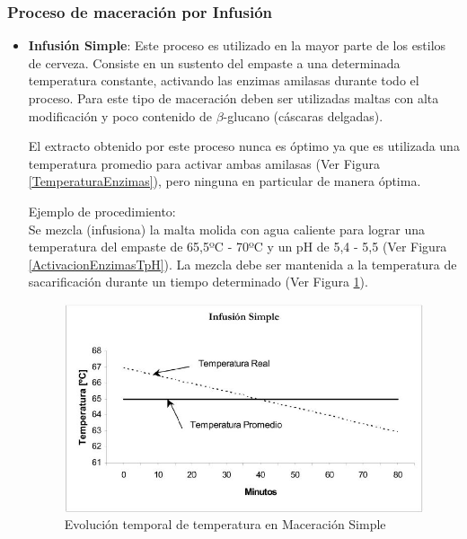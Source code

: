             \subsubsection{Proceso de maceración por Infusión}
                \begin{itemize}
                    \item \textbf{Infusión Simple}: Este proceso es utilizado en la mayor parte de los estilos de cerveza. Consiste en un sustento del empaste a una determinada temperatura constante, activando las enzimas amilasas durante todo el proceso. Para este tipo de maceración deben ser utilizadas maltas con alta modificación y poco contenido de $\beta$-glucano (cáscaras delgadas).
                    
                    \par El extracto obtenido por este proceso nunca es óptimo ya que es utilizada una temperatura promedio para activar ambas amilasas (Ver Figura \ref{TemperaturaEnzimas}), pero ninguna en particular de manera óptima.
                    
                    \par Ejemplo de procedimiento: \\ Se mezcla (infusiona) la malta molida con agua caliente para lograr una temperatura del empaste de 65,5ºC - 70ºC y un pH de 5,4 - 5,5 (Ver Figura \ref{ActivacionEnzimasTpH}). La mezcla debe ser mantenida a la temperatura de sacarificación durante un tiempo determinado (Ver Figura \ref{MaceracionSimple}).
                    
                    \begin{figure} [H]		                                                            \centerline{\includegraphics[scale=0.7]{maceracion_simple.jpg}}
                        \caption{Evolución temporal de temperatura en Maceración Simple}
                        \label{MaceracionSimple}
                    \end{figure}
                    

\end{itemize}
